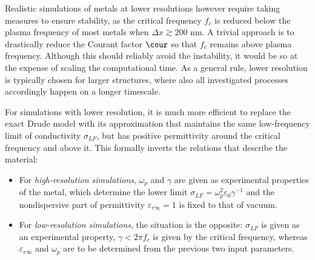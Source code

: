 Realistic simulations of metals at lower resolutions however require taking measures to ensure stability, as the critical frequency $f_c$ is reduced below the plasma frequency of most metals when $\Delta x \gtrsim 200$ nm. %
A trivial approach is to drastically reduce the Courant factor $\cour$ so that $f_c$ remains above plasma frequency. Although this should reliably avoid the instability, it would be so at the expense of scaling the computational time. As a general rule, lower resolution is typically chosen for larger structures, where also all investigated processes accordingly happen on a longer timescale.

For simulations with lower resolution, it is much more efficient to replace the exact Drude model with its approximation that maintains the same low-frequency limit of conductivity $\sigma_{LF}$, but has positive permittivity around the critical frequency and above it. 
This formally inverts the relations that describe the material:
\begin{itemize}
\item{
For \textit{high-resolution simulations}, $\omega_p$ and $\gamma$ are given as experimental properties of the metal, which determine the lower limit $\sigma_{LF} = \omega_p^2\varepsilon_0\gamma^{-1}$ and the nondispersive part of permittivity $\varepsilon_{r\infty} = 1$ is fixed to that of vacuum. 
} 
\item{
For \textit{low-resolution simulations}, the situation is the opposite: $\sigma_{LF}$ is given as an experimental property, $\gamma < 2\pi f_c$ is given by the critical frequency, %
whereas $\varepsilon_{r\infty}$ and $\omega_p$ are to be determined from the previous two input parameters.
} 
\end{itemize}

